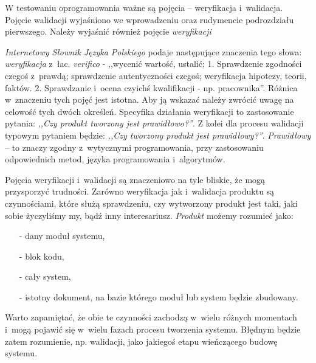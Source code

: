 \documentclass{xmgr}
\begin{document}
\indent \indent \indent \textcolor{sb}{W testowaniu oprogramowania ważne są pojęcia – weryfikacja i~walidacja.} \textcolor{sa}{Pojęcie walidacji wyjaśniono we wprowadzeniu oraz rudymencie podrozdziału pierwszego.} \textcolor{sb}{Należy wyjaśnić również pojęcie \textit{weryfikacji}}

\textcolor{sa}{\textit{Internetowy Słownik Języka Polskiego} podaje następujące znaczenia tego słowa: \textit{weryfikacja} z~łac. \textit{verifico} - ,,wycenić wartość, ustalić; 1. Sprawdzenie zgodności czegoś z~prawdą; sprawdzenie autentyczności czegoś; weryfikacja hipotezy, teorii, faktów. 2. Sprawdzanie i~ocena czyichś kwalifikacji - np. pracownika''.} \textcolor{sb}{Różnica w~znaczeniu tych pojęć jest istotna.} \textcolor{sa}{Aby ją wskazać należy zwrócić uwagę na celowość tych dwóch określeń.} \textcolor{sb}{Specyfika działania weryfikacji to zastosowanie pytania:} \textcolor{sa}{\textit{,,Czy produkt tworzony jest prawidłowo?''}.} \textcolor{sb}{Z kolei dla procesu walidacji typowym pytaniem będzie:} \textcolor{sa}{\textit{,,Czy tworzony produkt jest prawidłowy?''}.} \textcolor{sb}{\textit{Prawidłowy} – to znaczy} \textcolor{sa}{zgodny z~wytycznymi programowania, przy zastosowaniu odpowiednich metod, języka programowania i~algorytmów. }

\textcolor{sb}{Pojęcia weryfikacji i~walidacji są znaczeniowo na tyle bliskie, że mogą przysporzyć trudności.} \textcolor{sa}{Zarówno weryfikacja jak i~walidacja produktu są czynnościami, które służą sprawdzeniu,} \textcolor{sb}{czy wytworzony produkt jest taki, jaki sobie życzyliśmy my, bądź inny interesariusz.} \textcolor{sa}{\textit{Produkt} możemy rozumieć jako: }

\begin{itemize}
  \item[-] \textcolor{sa}{dany moduł systemu,}
  \item[-] \textcolor{sa}{blok kodu,}
  \item[-] \textcolor{sa}{cały system,}
  \item[-] \textcolor{sa}{istotny dokument, na bazie którego moduł lub system będzie zbudowany.}
\end{itemize}

\textcolor{sb}{Warto zapamiętać, że obie te czynności zachodzą w~wielu różnych momentach i~mogą pojawić się w~wielu fazach procesu tworzenia systemu.} \textcolor{sa}{Błędnym będzie zatem rozumienie, np. walidacji, jako jakiegoś etapu wieńczącego budowę systemu.}
\end{document}
